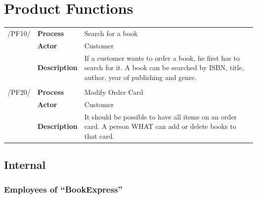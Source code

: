 \documentclass[11pt,a4paper,oneside,svgnames]{report}
\begin{document}
\chapter{Product Functions}
\begin{tabular}{llp{10cm}}
/PF10/	& \textbf{Process}		& Search for a book\\
		& \textbf{Actor}		& Customer\\
		& \textbf{Description}	& If a customer wants to order a book, he first has to search for it. A book can be searched by ISBN, title, author, year of publishing and genre.\\

\hfill \\

/PF20/	& \textbf{Process}		& Modify Order Card\\
		& \textbf{Actor}		& Customer\\
		& \textbf{Description}	& It should be possible to have all items on an order card. A person WHAT can add or delete books to that card.\\
\end{tabular} 

\section{Internal}
\subsection{Employees of ``BookExpress''}
\end{document}
